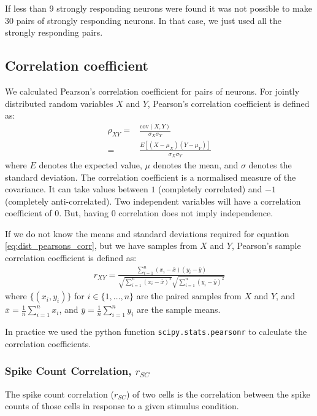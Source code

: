 \documentclass[a4paper,12pt]{article}
\theoremstyle{definition}
\newcommand{\cov}{\text{cov}} %
\begin{document}
If less than $9$ strongly responding neurons were found it was not possible to make $30$ pairs of strongly responding neurons. In that case, we just used all the strongly responding pairs.

\subsection{Correlation coefficient}
We calculated Pearson's correlation coefficient for pairs of neurons. For jointly distributed random variables $X$ and $Y$, Pearson's correlation coefficient is defined as:
\begin{align}\label{eq:dist_pearsons_corr}
  \rho_{XY} =& \frac{\cov(X,Y)}{\sigma_X \sigma_Y} \\
            =& \frac{E[(X - \mu_X)(Y - \mu_Y)]}{\sigma_X \sigma_Y}
\end{align}
where $E$ denotes the expected value, $\mu$ denotes the mean, and $\sigma$ denotes the standard deviation. The correlation coefficient is a normalised measure of the covariance. It can take values between $1$ (completely correlated) and $-1$ (completely anti-correlated). Two independent variables will have a correlation coefficient of $0$. But, having $0$ correlation does not imply independence.

If we do not know the means and standard deviations required for equation \ref{eq:dist_pearsons_corr}, but we have samples from $X$ and $Y$, Pearson's sample correlation coefficient is defined as:
\begin{align}
  r_{XY} = \frac{\sum_{i=1}^n (x_i - \bar{x})(y_i - \bar{y})}{\sqrt{\sum_{i=1}^n (x_i - \bar{x})^2}\sqrt{\sum_{i=1}^n (y_i - \bar{y})^2}}
\end{align}
where $\lbrace (x_i, y_i) \rbrace$ for $i \in \lbrace 1, \dots, n \rbrace$ are the paired samples from $X$ and $Y$, and $\bar{x} = \frac{1}{n}\sum_{i=1}^n x_i$, and $\bar{y} = \frac{1}{n}\sum_{i=1}^n y_i$ are the sample means.

In practice we used the python function \texttt{scipy.stats.pearsonr} to calculate the correlation coefficients.

\subsubsection{Spike Count Correlation, $r_{SC}$}
The spike count correlation ($r_{SC}$) of two cells is the correlation between the spike counts of those cells in response to a given stimulus condition.
\end{document}
